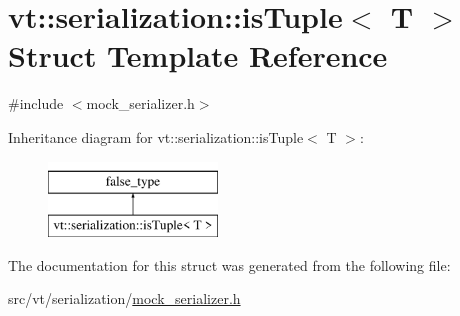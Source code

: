 \hypertarget{structvt_1_1serialization_1_1is_tuple}{}\section{vt\+:\+:serialization\+:\+:is\+Tuple$<$ T $>$ Struct Template Reference}
\label{structvt_1_1serialization_1_1is_tuple}


{\ttfamily \#include $<$mock\+\_\+serializer.\+h$>$}

Inheritance diagram for vt\+:\+:serialization\+:\+:is\+Tuple$<$ T $>$\+:\begin{figure}[H]
\begin{center}
\leavevmode
\includegraphics[height=2.000000cm]{structvt_1_1serialization_1_1is_tuple}
\end{center}
\end{figure}


The documentation for this struct was generated from the following file\+:\begin{DoxyCompactItemize}
\item 
src/vt/serialization/\hyperlink{mock__serializer_8h}{mock\+\_\+serializer.\+h}\end{DoxyCompactItemize}
